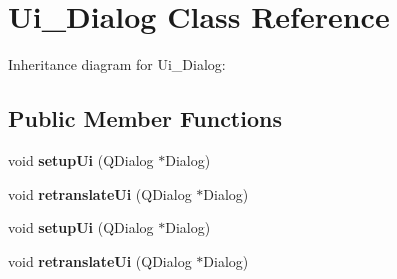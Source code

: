 \hypertarget{classUi__Dialog}{}\section{Ui\+\_\+\+Dialog Class Reference}
\label{classUi__Dialog}


Inheritance diagram for Ui\+\_\+\+Dialog\+:
\subsection*{Public Member Functions}
\begin{DoxyCompactItemize}
\item 
\mbox{\label{classUi__Dialog_a4f6a478c3ecdafabffb17b39cb26444a}} 
void {\bfseries setup\+Ui} (Q\+Dialog $\ast$Dialog)
\item 
\mbox{\label{classUi__Dialog_afa0ccb6f716ca6178260522a193c250e}} 
void {\bfseries retranslate\+Ui} (Q\+Dialog $\ast$Dialog)
\item 
\mbox{\label{classUi__Dialog_a4f6a478c3ecdafabffb17b39cb26444a}} 
void {\bfseries setup\+Ui} (Q\+Dialog $\ast$Dialog)
\item 
\mbox{\label{classUi__Dialog_afa0ccb6f716ca6178260522a193c250e}} 
void {\bfseries retranslate\+Ui} (Q\+Dialog $\ast$Dialog)
\end{DoxyCompactItemize}
